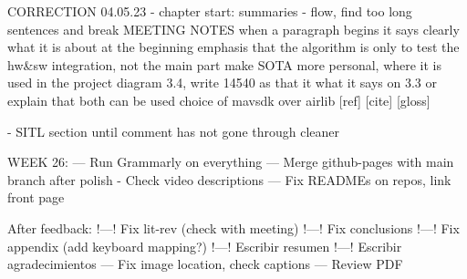 CORRECTION 04.05.23
 - chapter start: summaries
 - flow, find too long sentences and break
 MEETING NOTES
when a paragraph begins it says clearly what it is about at the beginning
emphasis that the algorithm is only to test the hw&sw integration, not the main part
make SOTA more personal, where it is used in the project
diagram 3.4, write 14540 as that it what it says on 3.3 or explain that both can be used
choice of mavsdk over airlib
[ref] [cite] [gloss]

- SITL section until comment has not gone through cleaner

 
WEEK 26:
    --- Run Grammarly on everything
    --- Merge github-pages with main branch after polish
        - Check video descriptions
    --- Fix READMEs on repos, link front page
        
After feedback:
    !---! Fix lit-rev (check with meeting)
    !---! Fix conclusions
    !---! Fix appendix (add keyboard mapping?)
    !---! Escribir resumen
    !---! Escribir agradecimientos
    --- Fix image location, check captions
    --- Review PDF

    